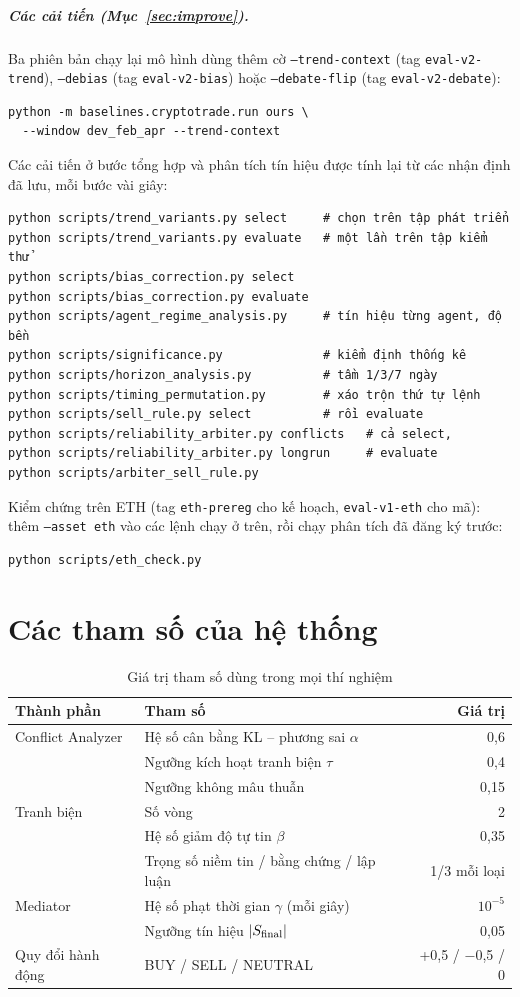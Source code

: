 \paragraph{Các cải tiến (Mục~\ref{sec:improve}).} Ba phiên bản chạy lại mô hình dùng thêm cờ
\texttt{--trend-context} (tag \texttt{eval-v2-trend}), \texttt{--debias} (tag \texttt{eval-v2-bias}) hoặc
\texttt{--debate-flip} (tag \texttt{eval-v2-debate}):
\begin{Verbatim}
python -m baselines.cryptotrade.run ours \
  --window dev_feb_apr --trend-context
\end{Verbatim}
Các cải tiến ở bước tổng hợp và phân tích tín hiệu được tính lại từ các nhận định đã lưu, mỗi bước vài giây:
\begin{Verbatim}
python scripts/trend_variants.py select     # chọn trên tập phát triển
python scripts/trend_variants.py evaluate   # một lần trên tập kiểm thử
python scripts/bias_correction.py select
python scripts/bias_correction.py evaluate
python scripts/agent_regime_analysis.py     # tín hiệu từng agent, độ bền
python scripts/significance.py              # kiểm định thống kê
python scripts/horizon_analysis.py          # tầm 1/3/7 ngày
python scripts/timing_permutation.py        # xáo trộn thứ tự lệnh
python scripts/sell_rule.py select          # rồi evaluate
python scripts/reliability_arbiter.py conflicts   # cả select,
python scripts/reliability_arbiter.py longrun     # evaluate
python scripts/arbiter_sell_rule.py
\end{Verbatim}
Kiểm chứng trên ETH (tag \texttt{eth-prereg} cho kế hoạch, \texttt{eval-v1-eth} cho mã): thêm \texttt{--asset eth} vào
các lệnh chạy ở trên, rồi chạy phân tích đã đăng ký trước:
\begin{Verbatim}
python scripts/eth_check.py
\end{Verbatim}

\chapter{Các tham số của hệ thống}
\begin{table}[H]
\centering
\caption{Giá trị tham số dùng trong mọi thí nghiệm}
\begin{tabular}{llr}
\toprule
Thành phần & Tham số & Giá trị \\
\midrule
Conflict Analyzer & Hệ số cân bằng KL -- phương sai $\alpha$ & 0,6 \\
 & Ngưỡng kích hoạt tranh biện $\tau$ & 0,4 \\
 & Ngưỡng không mâu thuẫn & 0,15 \\
Tranh biện & Số vòng & 2 \\
 & Hệ số giảm độ tự tin $\beta$ & 0,35 \\
 & Trọng số niềm tin / bằng chứng / lập luận & 1/3 mỗi loại \\
Mediator & Hệ số phạt thời gian $\gamma$ (mỗi giây) & $10^{-5}$ \\
 & Ngưỡng tín hiệu $|S_{\text{final}}|$ & 0,05 \\
Quy đổi hành động & BUY / SELL / NEUTRAL & +0,5 / $-$0,5 / 0 \\
\bottomrule
\end{tabular}
\end{table}
